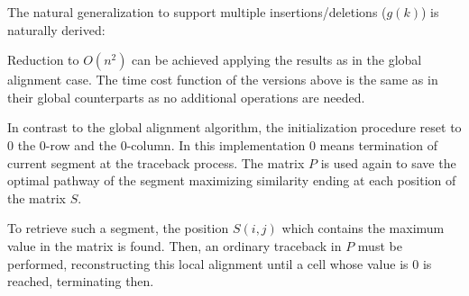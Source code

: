 The natural generalization to support multiple insertions/deletions ($g(k)$) is naturally derived:

\begin{center}
\end{center}

Reduction to $O(n^2)$ can be achieved applying the \citet{gotoh:1982a} results as in the global alignment
case. The time cost function of the versions above is the same as in their global counterparts as no additional
operations are needed.



In contrast to the global alignment algorithm, the initialization procedure reset to $0$ the 0-row and the
0-column. In this implementation $0$ means termination of current segment at the traceback process.
The matrix $P$ is used again to save the optimal pathway of the segment maximizing similarity ending at
each position of the matrix $S$.

To retrieve such a segment, the position $S(i,j)$ which contains the maximum value in the matrix is found.
Then, an ordinary traceback in $P$ must be performed, reconstructing this local alignment until a cell 
whose value is $0$ is reached, terminating then.


